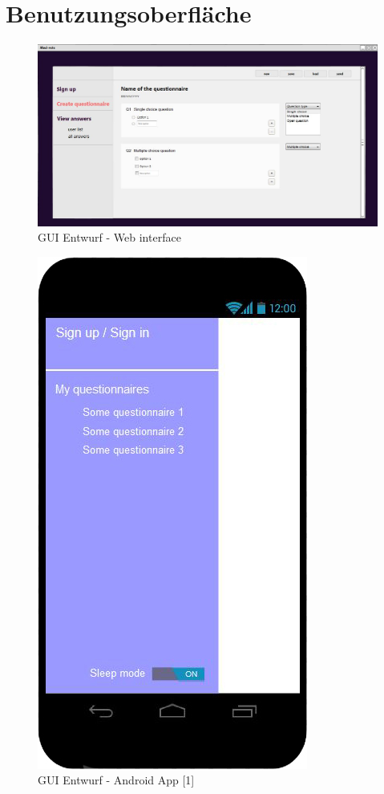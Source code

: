 \documentclass[a4paper]{scrreprt}
\begin{document}
    \chapter{Benutzungsoberfläche}

        \begin{figure}[ht]
            \centering
            \includegraphics[scale = 0.4]{web.jpg}
            \caption{GUI Entwurf - Web interface}
        \end{figure}
	
	\begin{figure}[ht]
            \centering
            \includegraphics[scale = 0.3]{android1.jpg}
            \caption{GUI Entwurf - Android App [1]}
        \end{figure}
	
\end{document}
